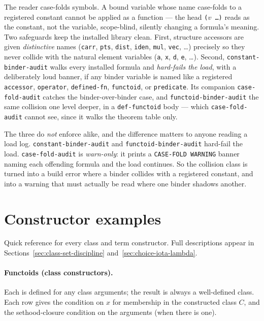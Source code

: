 \begin{remark}
\label{rem:case-fold}
The reader case-folds symbols.  A bound variable whose name case-folds
to a registered constant cannot be applied as a function --- the head
\texttt{($v$ \ldots)} reads as the constant, not the variable, scope-blind,
silently changing a formula's meaning.  Two safeguards keep the installed
library clean.  First, structure accessors are given \emph{distinctive}
names (\texttt{carr}, \texttt{pts}, \texttt{dist}, \texttt{iden}, \texttt{mul},
\texttt{vec}, \ldots) precisely so they never collide with the natural
element variables (\texttt{a}, \texttt{x}, \texttt{d}, \texttt{e}, \ldots).
Second, \texttt{constant-binder-audit} walks every installed formula and
\emph{hard-fails the load}, with a deliberately loud banner, if any binder
variable is named like a registered \texttt{accessor}, \texttt{operator},
\texttt{defined-fn}, \texttt{functoid}, or \texttt{predicate}.  Its companion
\texttt{case-fold-audit} catches the binder-over-binder case, and
\texttt{functoid-binder-audit} the same collision one level deeper, in a
\texttt{def-functoid} body --- which \texttt{case-fold-audit} cannot see, since
it walks the theorem table only.

The three do \emph{not} enforce alike, and the difference matters to anyone
reading a load log.  \texttt{constant-binder-audit} and
\texttt{functoid-binder-audit} hard-fail the load.  \texttt{case-fold-audit} is
\emph{warn-only}: it prints a \texttt{CASE-FOLD WARNING} banner naming each
offending formula and the load continues.  So the collision class is turned into
a build error where a binder collides with a registered constant, and into a
warning that must actually be read where one binder shadows another.
\end{remark}

\section{Constructor examples}
\label{sec:constructor-examples}

Quick reference for every class and term constructor.  Full descriptions
appear in Sections~\ref{sec:class-set-discipline}
and~\ref{sec:choice-iota-lambda}.

\paragraph{Functoids (class constructors).}  Each is defined for any class
arguments; the result is always a well-defined class.  Each row gives the
condition on $x$ for membership in the constructed class $C$, and the
sethood-closure condition on the arguments (when there is one).

